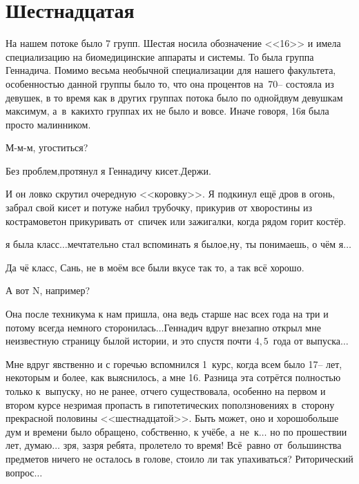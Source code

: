 \newpage
\section*{Шестнадцатая}

На нашем потоке было 7 групп. Шестая носила обозначение <<16>> и имела специализацию на биомедицинские аппараты и системы. То была группа Геннадича. Помимо весьма необычной специализации для нашего факультета, особенностью данной группы было то, что она процентов на~70\thinspace\nobreakdash-- состояла из девушек, в то время как в других группах потока было по одной\sdash двум девушкам максимум, а~в~каких\sdash то группах их не было и вовсе. Иначе говоря, 16\sdash я была просто малинником.


\diagdash М-м-м, угоститься?

\diagdash Без проблем,\mdash протянул я Геннадичу кисет.\mdash Держи.

И он ловко скрутил очередную <<коровку>>. Я подкинул ещё дров в огонь, забрал свой кисет и потуже набил трубочку, прикурив от хворостины из костра\mdash моветон прикуривать от~спичек или зажигалки, когда рядом горит костёр.

\sdash я была класс$\ldots$\mdash мечтательно стал вспоминать я былое,\mdash ну, ты понимаешь, о чём я$\ldots$

\diagdash Да чё класс, Сань, не в моём все были вкусе так то, а так всё хорошо.

\diagdash А вот N, например? 

\diagdash Она после техникума к нам пришла, она ведь старше нас всех года на три и потому всегда немного сторонилась$\ldots$\mdash Геннадич вдруг внезапно открыл мне неизвестную страницу былой истории, и это спустя почти $4,5$~года от выпуска$\ldots$

Мне вдруг явственно и с горечью вспомнился 1~курс, когда всем было 17\thinspace\nobreakdash-- лет, некоторым и более, как выяснилось, а мне 16. Разница эта сотрётся полностью только к~выпуску, но не ранее, отчего существовала, особенно на первом и втором курсе незримая пропасть в гипотетических поползновениях в~сторону прекрасной половины <<шестнадцатой>>. Быть может, оно и хорошо\mdash больше дум и времени было обращено, собственно, к учёбе, а~не~к$\ldots$ но по прошествии лет, думаю$\ldots$ зря, зазря ребята, пролетело то время! Всё~равно от~большинства предметов ничего не осталось в голове, стоило ли так упахиваться? Риторический вопрос$\ldots$

